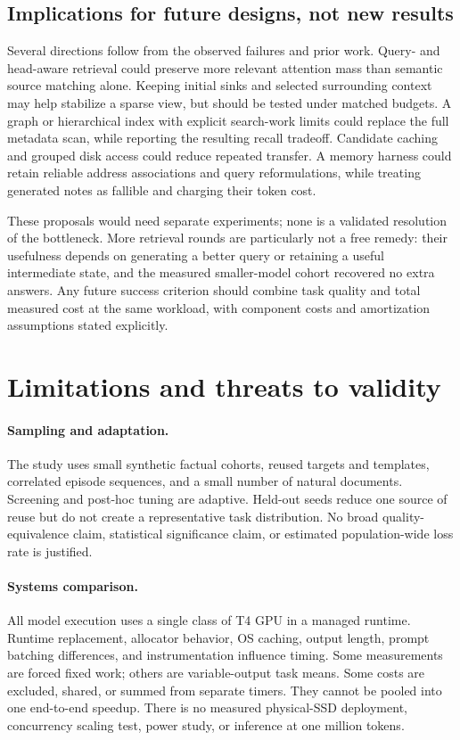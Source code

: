 \documentclass[11pt,letterpaper]{article}
\begin{document}
\subsection{Implications for future designs, not new results}
Several directions follow from the observed failures and prior work. Query- and head-aware retrieval could preserve more relevant attention mass than semantic source matching alone. Keeping initial sinks and selected surrounding context may help stabilize a sparse view, but should be tested under matched budgets. A graph or hierarchical index with explicit search-work limits could replace the full metadata scan, while reporting the resulting recall tradeoff. Candidate caching and grouped disk access could reduce repeated transfer. A memory harness could retain reliable address associations and query reformulations, while treating generated notes as fallible and charging their token cost.

These proposals would need separate experiments; none is a validated resolution of the bottleneck. More retrieval rounds are particularly not a free remedy: their usefulness depends on generating a better query or retaining a useful intermediate state, and the measured smaller-model cohort recovered no extra answers. Any future success criterion should combine task quality and total measured cost at the same workload, with component costs and amortization assumptions stated explicitly.

\section{Limitations and threats to validity}
\paragraph{Sampling and adaptation.} The study uses small synthetic factual cohorts, reused targets and templates, correlated episode sequences, and a small number of natural documents. Screening and post-hoc tuning are adaptive. Held-out seeds reduce one source of reuse but do not create a representative task distribution. No broad quality-equivalence claim, statistical significance claim, or estimated population-wide loss rate is justified.

\paragraph{Systems comparison.} All model execution uses a single class of T4 GPU in a managed runtime. Runtime replacement, allocator behavior, OS caching, output length, prompt batching differences, and instrumentation influence timing. Some measurements are forced fixed work; others are variable-output task means. Some costs are excluded, shared, or summed from separate timers. They cannot be pooled into one end-to-end speedup. There is no measured physical-SSD deployment, concurrency scaling test, power study, or inference at one million tokens.
\end{document}
